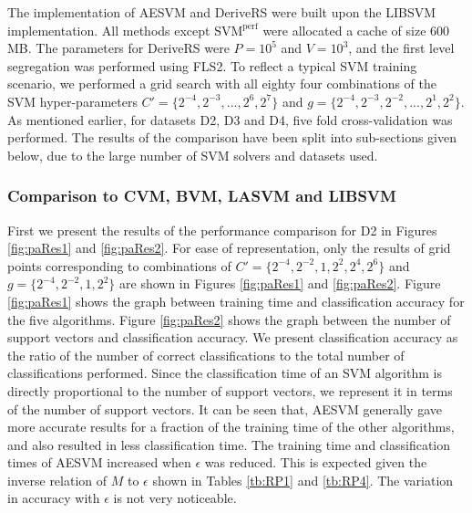 \documentclass[twoside]{article}
\begin{document}
The implementation of AESVM and DeriveRS were built upon the LIBSVM implementation. All methods except $\text{SVM}^{\text{perf}}$ were allocated a cache of size 600 MB. The parameters for DeriveRS were $P = 10^5$ and $V= 10^3$, and the first level segregation was performed using FLS2. To reflect a typical SVM training scenario, we performed a grid search with all eighty four combinations of the SVM hyper-parameters $C' = \{2^{-4},2^{-3},...,2^6,2^7\}$ and $g = \{2^{-4},2^{-3},2^{-2},...,2^1,2^2\}$. As mentioned earlier, for datasets D2, D3 and D4, five fold cross-validation was performed. The results of the comparison have been split into sub-sections given below, due to the large number of SVM solvers and datasets used.%


\subsubsection{Comparison to CVM, BVM, LASVM and LIBSVM}

First we present the results of the performance comparison for D2 in Figures \ref{fig:paRes1} and \ref{fig:paRes2}. For ease of representation, only the results of grid points corresponding to combinations of $C' = \{2^{-4},2^{-2},1,2^{2},2^{4},2^6\}$ and $g = \{2^{-4},2^{-2},1,2^2\}$ are shown in Figures \ref{fig:paRes1} and \ref{fig:paRes2}. Figure \ref{fig:paRes1} shows the graph between training time and classification accuracy for the five algorithms. Figure \ref{fig:paRes2} shows the graph between the number of support vectors and classification accuracy. We present classification accuracy as the ratio of the number of correct classifications to the total number of classifications performed. Since the classification time of an SVM algorithm is directly proportional to the number of support vectors, we represent it in terms of the number of support vectors. It can be seen that, AESVM generally gave more accurate results for a fraction of the training time of the other algorithms, and also resulted in less classification time. The training time and classification times of AESVM increased when $\epsilon$ was reduced. This is expected given the inverse relation of $M$ to $\epsilon$ shown in Tables \ref{tb:RP1} and \ref{tb:RP4}. The variation in accuracy with $\epsilon$ is not very noticeable.
%
\end{document}
